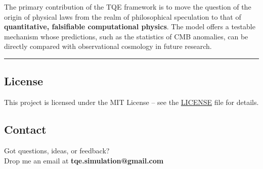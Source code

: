 The primary contribution of the TQE framework is to move the question of
the origin of physical laws from the realm of philosophical speculation
to that of \textbf{quantitative, falsifiable computational physics}. The
model offers a testable mechanism whose predictions, such as the
statistics of CMB anomalies, can be directly compared with observational
cosmology in future research.

\begin{center}\rule{0.5\linewidth}{0.5pt}\end{center}

\subsection{License}\label{license}

This project is licensed under the MIT License -- see the
\href{./LICENSE}{LICENSE} file for details.

\subsection{Contact}\label{contact}

Got questions, ideas, or feedback?\\
Drop me an email at \textbf{tqe.simulation@gmail.com}
